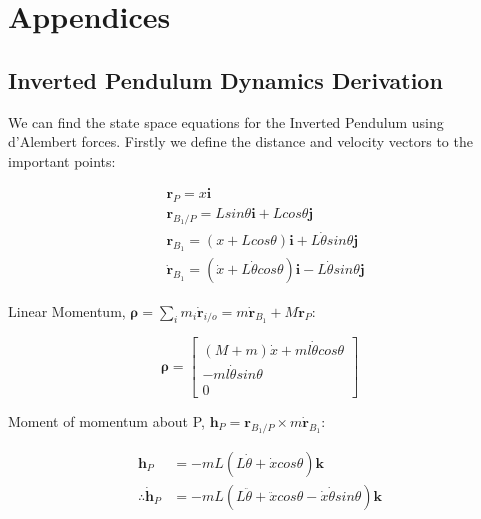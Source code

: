 \documentclass[../main.tex]{subfiles}
\begin{document}
\chapter{Appendices}
\section{Inverted Pendulum Dynamics Derivation}
\label{appendix:invpen}

We can find the state space equations for the Inverted Pendulum using d'Alembert forces. Firstly we define the distance and velocity vectors to the important points:

\begin{align*}
    & \boldsymbol{r}_P = x \boldsymbol{i} \\
    & \boldsymbol{r}_{B_1/P} = L sin \theta \boldsymbol{i} + L cos \theta \boldsymbol{j} \\
    & \boldsymbol{r}_{B_1} = (x+L cos \theta)\boldsymbol{i}+L \dot{\theta} sin \theta  \boldsymbol{j} \\
    & \dot{\boldsymbol{r}}_{B_1} = (\dot{x} + L\dot{\theta}cos\theta)\boldsymbol{i} - L\dot{\theta}sin\theta \boldsymbol{j}
\end{align*}

Linear Momentum, $\boldsymbol{\rho} = \sum_i m_i \dot{\boldsymbol{r}}_{i/o} = m \dot{\boldsymbol{r}}_{B_1} + M \dot{\boldsymbol{r}}_{P}$:

\begin{equation*}
\boldsymbol{\rho} = 
\begin{bmatrix} (M+m)\dot{x} + ml\dot{\theta}cos{\theta} \\ -ml\dot{\theta}sin{\theta} \\ 0 \end{bmatrix} 
\end{equation*}

Moment of momentum about P, $\boldsymbol{h}_P = \boldsymbol{r}_{B_1/P} \times m \boldsymbol{\dot{r}}_{B_1}$:

\begin{align*}
\boldsymbol{h}_P & = -m L(L\dot{\theta} + \dot{x}cos\theta) \boldsymbol{k} \\
\therefore \boldsymbol{\dot{h}}_P & = -mL(L\ddot{\theta} + \ddot{x}cos\theta - \dot{x}\dot{\theta}sin\theta) \boldsymbol{k}
\end{align*}
\end{document}
